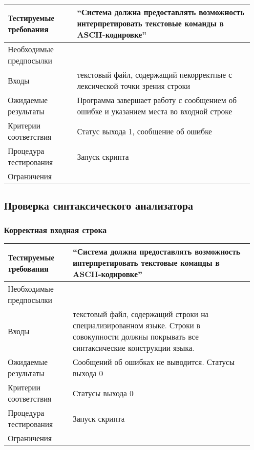 \documentclass[a4paper, 12pt]{article}
\begin{document}
\begin{tabular}{|l|p{4in}|}
	\hline
	Тестируемые требования	&``Система должна предоставлять возможность интерпретировать текстовые
	команды в ASCII-кодировке''\\
	\hline
	Необходимые предпосылки	&\\
	\hline
	Входы			&текстовый файл, содержащий некорректные с лексической точки
	зрения строки\\
	\hline
	Ожидаемые результаты	&Программа завершает работу с сообщением об ошибке и 
	указанием места во входной строке\\
	\hline
	Критерии соответствия	&Статус выхода 1, \newline сообщение об ошибке\\
	\hline
	Процедура тестирования	&Запуск скрипта\\
	\hline
	Ограничения		&\\
	\hline
\end{tabular}

\subsection{Проверка синтаксического анализатора} %

\subsubsection{Корректная входная строка} %

\begin{tabular}{|l|p{4in}|}
	\hline
	Тестируемые требования	&``Система должна предоставлять возможность интерпретировать текстовые
	команды в ASCII-кодировке''\\
	\hline
	Необходимые предпосылки	&\\
	\hline
	Входы			&текстовый файл, содержащий строки на специализированном языке.\newline
				Строки в совокупности должны покрывать все синтаксические конструкции языка.\\
	\hline
	Ожидаемые результаты	&Сообщений об ошибках не выводится. Статусы выхода 0\\
	\hline
	Критерии соответствия	&Статусы выхода 0\\
	\hline
	Процедура тестирования	&Запуск скрипта\\
	\hline
	Ограничения		&\\
	\hline
\end{tabular}
\end{document}
